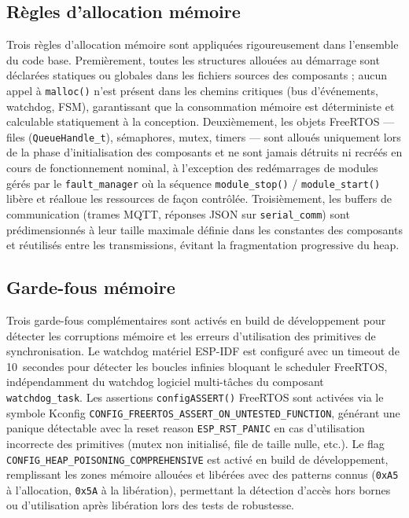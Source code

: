 \subsection{Règles d'allocation mémoire}
\label{subsec:alloc}

Trois règles d'allocation mémoire sont appliquées rigoureusement dans
l'ensemble du code base. Premièrement, toutes les structures allouées
au démarrage sont déclarées statiques ou globales dans les fichiers
sources des composants ; aucun appel à \texttt{malloc()} n'est présent
dans les chemins critiques (bus d'événements, watchdog, FSM), garantissant
que la consommation mémoire est déterministe et calculable statiquement
à la conception. Deuxièmement, les objets FreeRTOS — files
(\texttt{QueueHandle\_t}), sémaphores, mutex, timers — sont alloués
uniquement lors de la phase d'initialisation des composants et ne
sont jamais détruits ni recréés en cours de fonctionnement nominal,
à l'exception des redémarrages de modules gérés par le
\texttt{fault\_manager} où la séquence \texttt{module\_stop()} /
\texttt{module\_start()} libère et réalloue les ressources de façon
contrôlée. Troisièmement, les buffers de communication (trames MQTT,
réponses JSON sur \texttt{serial\_comm}) sont prédimensionnés à leur
taille maximale définie dans les constantes des composants et réutilisés
entre les transmissions, évitant la fragmentation progressive du heap.

\subsection{Garde-fous mémoire}
\label{subsec:guards}

Trois garde-fous complémentaires sont activés en build de développement
pour détecter les corruptions mémoire et les erreurs d'utilisation
des primitives de synchronisation. Le watchdog matériel ESP-IDF est
configuré avec un timeout de 10~secondes pour détecter les boucles
infinies bloquant le scheduler FreeRTOS, indépendamment du watchdog
logiciel multi-tâches du composant \texttt{watchdog\_task}. Les
assertions \texttt{configASSERT()} FreeRTOS sont activées via le
symbole Kconfig \texttt{CONFIG\_FREERTOS\_ASSERT\_ON\_UNTESTED\_FUNCTION},
générant une panique détectable avec la reset reason
\texttt{ESP\_RST\_PANIC} en cas d'utilisation incorrecte des primitives
(mutex non initialisé, file de taille nulle, etc.). Le flag
\texttt{CONFIG\_HEAP\_POISONING\_COMPREHENSIVE} est activé en build
de développement, remplissant les zones mémoire allouées et libérées
avec des patterns connus (\texttt{0xA5} à l'allocation, \texttt{0x5A}
à la libération), permettant la détection d'accès hors bornes ou
d'utilisation après libération lors des tests de robustesse.

